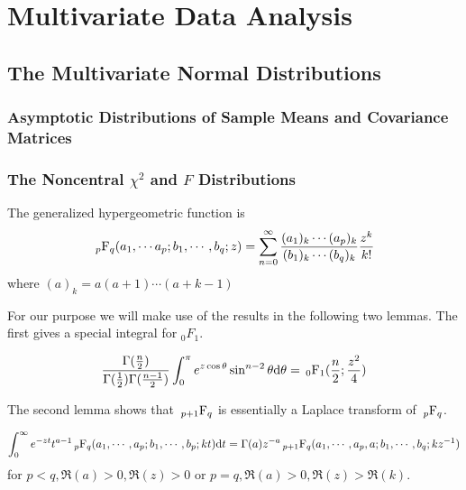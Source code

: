 \chapter{Multivariate Data Analysis}
\section{The Multivariate Normal Distributions}
\subsection{Asymptotic Distributions of Sample Means and Covariance Matrices}


\subsection{The Noncentral \texorpdfstring{$\chi^2$}{} and \texorpdfstring{$F$}{} Distributions}
\begin{definition}
The generalized hypergeometric function is
\[\sideset{_{p}}{_q}{\operatorname{F}} (a_1,\cdots a_p;b_1,\cdots,b_q;z)=\sum_{n=0}^\infty \frac{(a_1)_k\cdots (a_p)_k}{(b_1)_k\cdots (b_q)_k}\frac{z^k}{k!}\]
where $(a)_k=a(a+1)\cdots (a+k-1)$
\end{definition}

For our purpose we will make use of the results in the following two lemmas. The first gives a special integral for $_0F_1$.
\begin{lemma}
\[\frac{\Gamma(\frac{n}{2})}{\Gamma(\frac{1}{2})\Gamma(\frac{n-1}{2})}\int_0^\pi e^{z\cos \theta}\sin^{n-2}\theta\mathrm{d}\theta=\sideset{_0}{_1}{\operatorname{F}}(\frac{n}{2};\frac{z^2}{4})\]
\end{lemma}
The second lemma shows that $\sideset{_{p+1}}{_q}{\operatorname{F}}$ is essentially a Laplace transform of $\sideset{_p}{_q}{\operatorname{F}}$.
\begin{lemma}
\[\int_0^\infty e^{-zt}t^{a-1}\sideset{_p}{_q}{\operatorname{F}}(a_1,\cdots,a_p;b_1,\cdots,b_p;kt)\mathrm{d}t=\Gamma(a)z^{-a}\sideset{_{p+1}}{_q}{\operatorname{F}}(a_1,\cdots,a_p,a;b_1,\cdots,b_q;kz^{-1})\]
for $p<q,\Re(a)>0,\Re(z)>0$ or $p=q,\Re(a)>0,\Re(z)>\Re(k)$.
\end{lemma}

